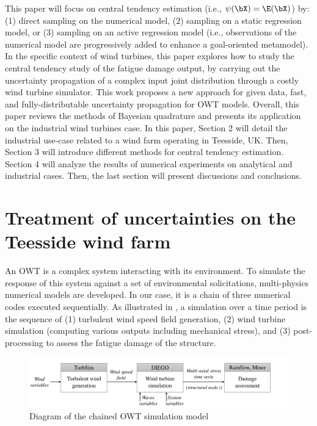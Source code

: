 This paper will focus on central tendency estimation (i.e., $\psi(\bX) = \E(\bX)$) by: (1) direct sampling on the numerical model, (2) sampling on a static regression model, or (3) sampling on an active regression model (i.e., observations of the numerical model are progressively added to enhance a goal-oriented metamodel). 
In the specific context of wind turbines, this paper explores how to study the central tendency study of the fatigue damage output, by carrying out the uncertainty propagation of a complex input joint distribution through a costly wind turbine simulator. 
This work proposes a new approach for given data, fast, and fully-distributable uncertainty propagation for OWT models. 
Overall, this paper reviews the methods of Bayesian quadrature and presents its application on the industrial wind turbines case.
In this paper, Section 2 will detail the industrial use-case related to a wind farm operating in Teesside, UK. 
Then, Section 3 will introduce different methods for central tendency estimation. 
Section 4 will analyze the results of numerical experiments on analytical and industrial cases. 
Then, the last section will present discussions and conclusions.

\section{Treatment of uncertainties on the Teesside wind farm}\label{sec1}

An OWT is a complex system interacting with its environment. 
To simulate the response of this system against a set of environmental solicitations, multi-physics numerical models are developed. 
In our case, it is a chain of three numerical codes executed sequentially. 
As illustrated in , a simulation over a time period is the sequence of (1) turbulent wind speed field generation, (2) wind turbine simulation (computing various outputs including mechanical stress), and (3) post-processing to assess the fatigue damage of the structure.
\begin{figure}[!h]
\begin{center}
    \includegraphics[width=0.8\linewidth]{part2/figures/DCE/simulator_blocs.pdf}    
\end{center}
\caption{Diagram of the chained OWT simulation model}
\label{fig:bloc_diagram}
\end{figure}

